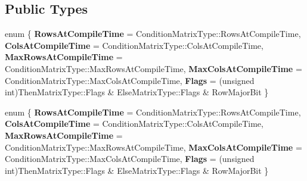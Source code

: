 \subsection*{Public Types}
\begin{DoxyCompactItemize}
\item 
\mbox{\label{struct_eigen_1_1internal_1_1traits_3_01_select_3_01_condition_matrix_type_00_01_then_matrix_type4a832542e824e444643efa2ac02419b2_a120e922056bb3db8f50f7be56db01580}} 
enum \{ \newline
{\bfseries Rows\+At\+Compile\+Time} = Condition\+Matrix\+Type\+:\+:Rows\+At\+Compile\+Time, 
{\bfseries Cols\+At\+Compile\+Time} = Condition\+Matrix\+Type\+:\+:Cols\+At\+Compile\+Time, 
{\bfseries Max\+Rows\+At\+Compile\+Time} = Condition\+Matrix\+Type\+:\+:Max\+Rows\+At\+Compile\+Time, 
{\bfseries Max\+Cols\+At\+Compile\+Time} = Condition\+Matrix\+Type\+:\+:Max\+Cols\+At\+Compile\+Time, 
\newline
{\bfseries Flags} = (unsigned int)Then\+Matrix\+Type\+:\+:Flags \& Else\+Matrix\+Type\+:\+:Flags \& Row\+Major\+Bit
 \}
\item 
\mbox{\label{struct_eigen_1_1internal_1_1traits_3_01_select_3_01_condition_matrix_type_00_01_then_matrix_type4a832542e824e444643efa2ac02419b2_a93244d674d012e1c9e08ca22a0c4c1fb}} 
enum \{ \newline
{\bfseries Rows\+At\+Compile\+Time} = Condition\+Matrix\+Type\+:\+:Rows\+At\+Compile\+Time, 
{\bfseries Cols\+At\+Compile\+Time} = Condition\+Matrix\+Type\+:\+:Cols\+At\+Compile\+Time, 
{\bfseries Max\+Rows\+At\+Compile\+Time} = Condition\+Matrix\+Type\+:\+:Max\+Rows\+At\+Compile\+Time, 
{\bfseries Max\+Cols\+At\+Compile\+Time} = Condition\+Matrix\+Type\+:\+:Max\+Cols\+At\+Compile\+Time, 
\newline
{\bfseries Flags} = (unsigned int)Then\+Matrix\+Type\+:\+:Flags \& Else\+Matrix\+Type\+:\+:Flags \& Row\+Major\+Bit
 \}
\item 
\mbox{\label{struct_eigen_1_1internal_1_1traits_3_01_select_3_01_condition_matrix_type_00_01_then_matrix_type4a832542e824e444643efa2ac02419b2_af25bcfe2b10edd4c712db322a67cf38d}} 

\end{DoxyCompactItemize}
